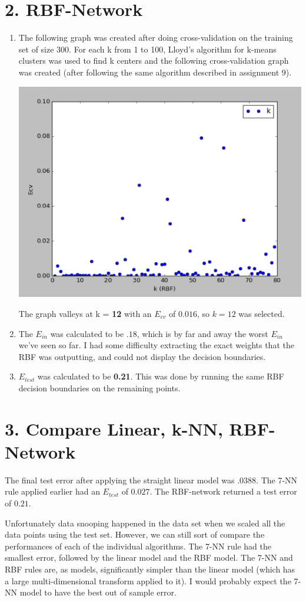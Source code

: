 \documentclass[12pt]{article}
\begin{document}
\section*{2. RBF-Network}
\begin{enumerate}[label=(\alph*)]
	\item The following graph was created after doing cross-validation on the training set of size 300. For each k from 1 to 100, Lloyd's algorithm for k-means clusters was used to find k centers and the following cross-validation graph was created (after following the same algorithm described in assignment 9).
	
	\includegraphics[scale=0.6]{2a.png}
	
	The graph valleys at k = \textbf{12} with an $E_{cv}$ of $0.016$, so $k = 12$ was selected.
	\item The $E_{in}$ was calculated to be $\boldsymbol{.18}$, which is by far and away the worst $E_{in}$ we've seen so far. I had some difficulty extracting the exact weights that the RBF was outputting, and could not display the decision boundaries.
	\item $E_{test}$ was calculated to be \textbf{0.21}. This was done by running the same RBF decision boundaries on the remaining points.
\end{enumerate}

\section*{3. Compare Linear, k-NN, RBF-Network}
The final test error after applying the straight linear model was $\boldsymbol{.0388}$. The 7-NN rule applied earlier had an $E_{test}$ of $\boldsymbol{0.027}$. The RBF-network returned a test error of $\boldsymbol{0.21}$.

Unfortunately data snooping happened in the data set when we scaled all the data points using the test set. However, we can still sort of compare the performances of each of the individual algorithms. The 7-NN rule had the smallest error, followed by the linear model and the RBF model. The 7-NN and RBF rules are, as models, significantly simpler than the linear model (which has a large multi-dimensional transform applied to it). I would probably expect the 7-NN model to have the best out of sample error. 
\end{document}
